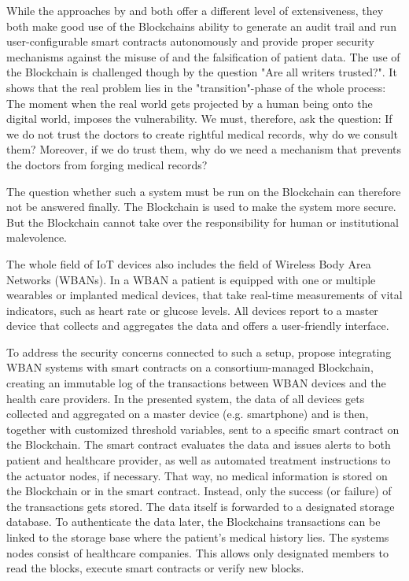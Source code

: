 While the approaches by \cite{Cao2019} and \cite{Azaria2016} both offer a different level of extensiveness, they both make good use of the Blockchains ability to generate an audit trail and run user-configurable smart contracts autonomously and provide proper security mechanisms against the misuse of and the falsification of patient data.
The use of the Blockchain is challenged though by the question "Are all writers trusted?"\cite{Wust2017}. It shows that the real problem lies in the "transition"-phase of the whole process: The moment when the real world gets projected by a human being onto the digital world, imposes the vulnerability. We must, therefore, ask the question: If we do not trust the doctors to create rightful medical records, why do we consult them? Moreover, if we do trust them, why do we need a mechanism that prevents the doctors from forging medical records?

The question whether such a system must be run on the Blockchain can therefore not be answered finally. The Blockchain is used to make the system more secure. But the Blockchain cannot take over the responsibility for human or institutional malevolence.

The whole field of IoT devices also includes the field of Wireless Body Area Networks (WBANs). In a WBAN a patient is equipped with one or multiple wearables or implanted medical devices, that take real-time measurements of vital indicators, such as heart rate or glucose levels. All devices report to a master device that collects and aggregates the data and offers a user-friendly interface.

To address the security concerns connected to such a setup, \cite{Baccarini2018} propose integrating WBAN systems with smart contracts on a consortium-managed Blockchain, creating an immutable log of the transactions between WBAN devices and the health care providers. \cite{Baccarini2018} 
In the presented system, the data of all devices gets collected and aggregated on a master device (e.g. smartphone) and is then, together with customized threshold variables, sent to a specific smart contract on the Blockchain. The smart contract evaluates the data and issues alerts to both patient and healthcare provider, as well as automated treatment instructions to the actuator nodes, if necessary.
That way, no medical information is stored on the Blockchain or in the smart contract. Instead, only the success (or failure) of the transactions gets stored. The data itself is forwarded to a designated storage database.
To authenticate the data later, the Blockchains transactions can be linked to the storage base where the patient's medical history lies.
The systems nodes consist of healthcare companies. This allows only designated members to read the blocks, execute smart contracts or verify new blocks.

